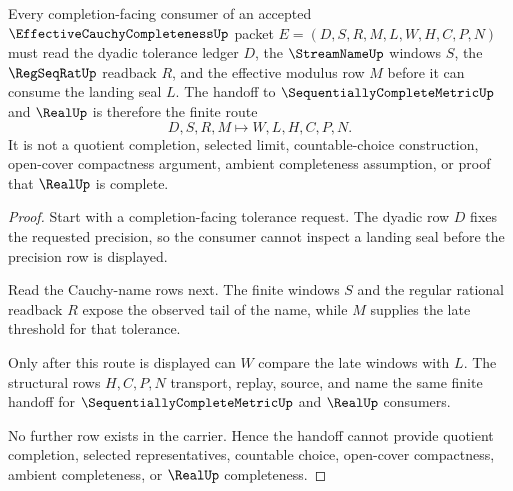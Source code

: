 \begin{theorem}
\label{thm:effective-cauchy-completeness-modulus-handoff}
Every completion-facing consumer of an accepted $\EffectiveCauchyCompletenessUp$ packet $E=(D,S,R,M,L,W,H,C,P,N)$ must read the dyadic tolerance ledger $D$, the $\StreamNameUp$ windows $S$, the $\RegSeqRatUp$ readback $R$, and the effective modulus row $M$ before it can consume the landing seal $L$. The handoff to $\SequentiallyCompleteMetricUp$ and $\RealUp$ is therefore the finite route
$$
D,S,R,M \longmapsto W,L,H,C,P,N .
$$
It is not a quotient completion, selected limit, countable-choice construction, open-cover compactness argument, ambient completeness assumption, or proof that $\RealUp$ is complete.
\end{theorem}
\begin{proof}
Start with a completion-facing tolerance request. The dyadic row $D$ fixes the requested precision, so the consumer cannot inspect a landing seal before the precision row is displayed.

Read the Cauchy-name rows next. The finite windows $S$ and the regular rational readback $R$ expose the observed tail of the name, while $M$ supplies the late threshold for that tolerance.

Only after this route is displayed can $W$ compare the late windows with $L$. The structural rows $H,C,P,N$ transport, replay, source, and name the same finite handoff for $\SequentiallyCompleteMetricUp$ and $\RealUp$ consumers.

No further row exists in the carrier. Hence the handoff cannot provide quotient completion, selected representatives, countable choice, open-cover compactness, ambient completeness, or $\RealUp$ completeness.
\end{proof}

